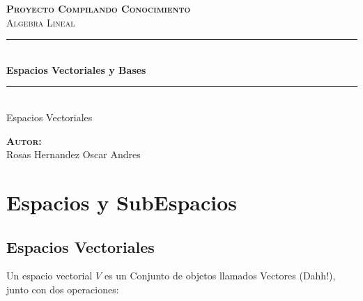 \documentclass[12pt]{report}							    %
\author{Oscar Andrés Rosas}						            %
\begin{document}
\begin{titlepage}

	\center
	\textbf{\textsc{\Large Proyecto Compilando Conocimiento}}\\[1.0cm] 
	\textsc{\Large Algebra Lineal}\\[1.0cm] 

	\rule{\linewidth}{0.5mm} \\[1.0cm]
		{ \huge \bfseries Espacios Vectoriales y Bases}\\[1.0cm] 
	\rule{\linewidth}{0.5mm} \\[2.0cm]
	
	{\LARGE Espacios Vectoriales}\\[7cm] 
	
	\begin{center} \large
	\textbf{\textsc{Autor:}}\\
	Rosas Hernandez Oscar Andres
	\end{center}

	\vfill

\end{titlepage}

\tableofcontents{}
\clearpage

\chapter{Espacios y SubEspacios}
    \clearpage

    \section{Espacios Vectoriales}
        Un espacio vectorial $V$ es un Conjunto de objetos
        llamados Vectores (Dahh!), junto con dos operaciones:
\end{document}
